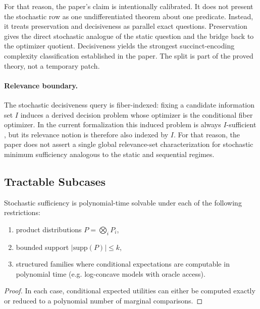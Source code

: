 For that reason, the paper's claim is intentionally calibrated. It does not present the stochastic row as one undifferentiated theorem about one predicate. Instead, it treats preservation and decisiveness as parallel exact questions. Preservation gives the direct stochastic analogue of the static question and the bridge back to the optimizer quotient. Decisiveness yields the strongest succinct-encoding complexity classification established in the paper. The split is part of the proved theory, not a temporary patch.

\paragraph{Relevance boundary.}
The stochastic decisiveness query is fiber-indexed: fixing a candidate information set $I$
induces a derived decision problem whose optimizer is the conditional fiber
optimizer. In the current formalization this induced problem is always
$I$-sufficient , but its relevance notion is therefore also
indexed by $I$. For that reason, the paper does not assert a single global
relevance-set characterization for stochastic minimum sufficiency analogous to
the static and sequential regimes.

\subsection{Tractable Subcases}

\begin{proposition}\label{prop:stochastic-tractable}
Stochastic sufficiency is polynomial-time solvable under each of the following restrictions:
\begin{enumerate}
\item product distributions $P=\bigotimes_i P_i$,
\item bounded support $|\mathrm{supp}(P)|\le k$,
\item structured families where conditional expectations are computable in polynomial time (e.g. log-concave models with oracle access).
\end{enumerate}
\end{proposition}


\begin{proof}
In each case, conditional expected utilities can either be computed exactly or reduced to a polynomial number of marginal comparisons.
\end{proof}

